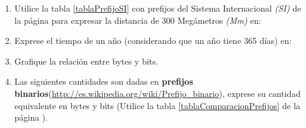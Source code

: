 \documentclass[12pt]{article}
\begin{document}
\begin{enumerate}

    \item Utilice la tabla \ref{tablaPrefijoSI} con prefijos del Sistema
        Internacional \emph{(SI)} de la página \pageref{tablaPrefijoSI} para
        expresar la distancia de 300 Megámetros \emph{(Mm)} en:


    \item Exprese el tiempo de un año (considerando que un año tiene 365 días)
        en:


    \item Grafique la relación entre bytes y bits.

    \item Las siguientes cantidades son dadas en \textbf{prefijos
        binarios}(\url{http://es.wikipedia.org/wiki/Prefijo_binario}), exprese
        su cantidad equivalente en bytes y bits (Utilice la tabla
        \ref{tablaComparacionPrefijos} de la página
        \pageref{tablaComparacionPrefijos}).


\end{enumerate}
\end{document}
